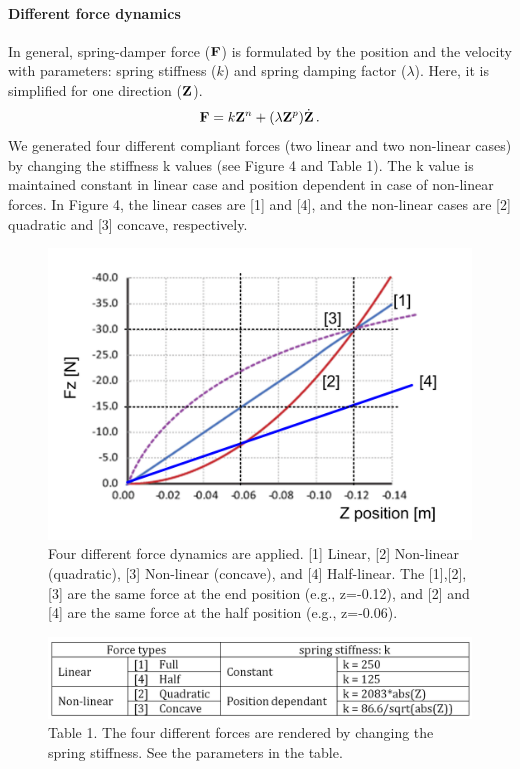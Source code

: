 \paragraph{Different force dynamics}
In general, spring-damper force ($\mathbf{F}$) is formulated by the position and the
velocity with parameters: spring stiffness ($k$) and spring damping factor
($\lambda$).  Here, it is simplified for one direction ($\mathbf{Z}$).
%
\begin{equation}
\mathbf{F} = k \mathbf{Z}^n + (\lambda \mathbf{Z}^p) \dot{\mathbf{Z}} \, .
\end{equation}
%
We generated four different compliant forces (two linear and two non-linear cases) by changing the stiffness k values (see Figure 4 and Table 1). The k value is maintained constant in linear case and position dependent in case of non-linear forces. In Figure 4, the linear cases are [1] and [4], and the non-linear cases are [2] quadratic and [3] concave, respectively.
\begin{figure}
	\centering
	\includegraphics[width=.7\textwidth]{Chie/figs/Figure4.png}
	\caption{Four different force dynamics are applied. [1] Linear, [2] Non-linear (quadratic), [3] Non-linear (concave), and [4] Half-linear. The [1],[2],[3] are the same force at the end position (e.g., z=-0.12), and [2] and [4] are the same force at the half position  (e.g., z=-0.06).}
	\label{forcedyn}
\end{figure}

\begin{figure}
	\centering
	\includegraphics[width=.7\textwidth]{Chie/figs/Table1.png}
	\caption{Table 1. The four different forces are rendered by changing the spring stiffness. See the parameters in the table.}
	\label{Table1}
\end{figure}

